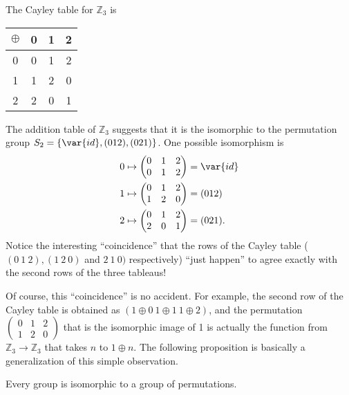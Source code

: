 \begin{example}\label{example:isomorph:cayley_isomorph}
The Cayley table for ${\mathbb Z}_3$ is  
\begin{center}
\begin{tabular}{c|ccc}
$\oplus$   & 0 & 1 & 2 \\
\hline
0     & 0 & 1 & 2 \\
1     & 1 & 2 & 0 \\
2     & 2 & 0 & 1
\end{tabular}
\end{center}
The addition table of ${\mathbb Z}_3$ suggests that it is the isomorphic to the permutation group $S_2 = \{ \var{id}, (0 1 2), (0 2 1) \}$.  One possible isomorphism  is 
\begin{align*}
0 & \mapsto
\begin{pmatrix}
0 & 1 & 2 \\
0 & 1 & 2
\end{pmatrix}
= \var{id} \\
1 & \mapsto
\begin{pmatrix}
0 & 1 & 2 \\
1 & 2 & 0
\end{pmatrix}
= (0 1 2) \\
2 & \mapsto
\begin{pmatrix}
0 & 1 & 2 \\
2 & 0 & 1
\end{pmatrix}
= (0 2 1).
\end{align*}
Notice the interesting ``coincidence'' that  the rows of the Cayley table ( $(0~1~2), (1~2~0)$ and $2~1~0)$ respectively)  ``just happen'' to agree exactly with the second rows of the three tableaus! 

Of course, this ``coincidence'' is no accident.
For example, the second row of the Cayley table is obtained as $(1\oplus 0~1\oplus 1~1\oplus 2)$, and the permutation $\begin{pmatrix}
0 & 1 & 2 \\
1 & 2 & 0
\end{pmatrix}$ 
that is the isomorphic image of 1 is actually the function from ${\mathbb Z}_3 \rightarrow {\mathbb Z}_3$ that takes $n$ to $1 \oplus n$.   The following proposition is basically a generalization of this simple observation.

\end{example}


\begin{thm}[Cayley]\label{isomorph_theorem_6}
Every group is isomorphic to a group of permutations.
\end{thm}

